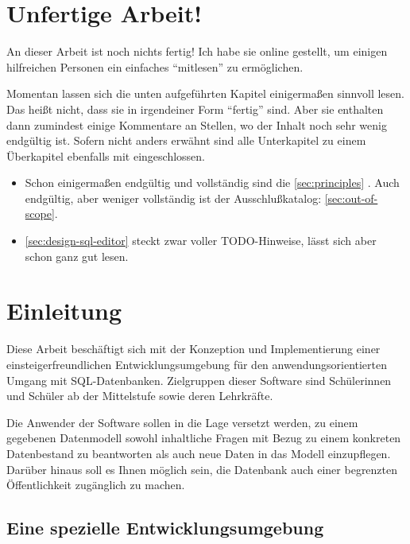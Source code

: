 \documentclass[paper=a4,fontsize=11pt,parskip=half]{scrartcl}
\title{\doctitle}
\subtitle{\docsubtitle}
\author{\docauthors}
\date{\today{}}
\begin{document}

\newpage{}

\section*{Unfertige Arbeit!}

An dieser Arbeit ist noch nichts fertig! Ich habe sie online gestellt, um einigen hilfreichen Personen ein einfaches ``mitlesen'' zu ermöglichen.

Momentan lassen sich die unten aufgeführten Kapitel einigermaßen sinnvoll lesen. Das heißt nicht, dass sie in irgendeiner Form ``fertig'' sind. Aber sie enthalten dann zumindest einige Kommentare an Stellen, wo der Inhalt noch sehr wenig endgültig ist. Sofern nicht anders erwähnt sind alle Unterkapitel zu einem Überkapitel ebenfalls mit eingeschlossen.

\begin{itemize}
  \item Schon einigermaßen endgültig und vollständig sind die \ref{sec:principles} . Auch endgültig, aber weniger vollständig ist der Ausschlußkatalog: \ref{sec:out-of-scope}. 
  \item \ref{sec:design-sql-editor}  steckt zwar voller TODO-Hinweise, lässt sich aber schon ganz gut lesen.
\end{itemize}

\tableofcontents{}
\newpage{}


\section{Einleitung}

Diese Arbeit beschäftigt sich mit der Konzeption und Implementierung einer einsteigerfreundlichen Entwicklungsumgebung für den anwendungsorientierten Umgang mit SQL-Datenbanken. Zielgruppen dieser Software sind Schülerinnen und Schüler ab der Mittelstufe sowie deren Lehrkräfte.

Die Anwender der Software sollen in die Lage versetzt werden, zu einem gegebenen Datenmodell sowohl inhaltliche Fragen mit Bezug zu einem konkreten Datenbestand zu beantworten als auch neue Daten in das Modell einzupflegen. Darüber hinaus soll es Ihnen möglich sein, die Datenbank auch einer begrenzten Öffentlichkeit zugänglich zu machen.

\subsection{Eine spezielle Entwicklungsumgebung}
\end{document}
